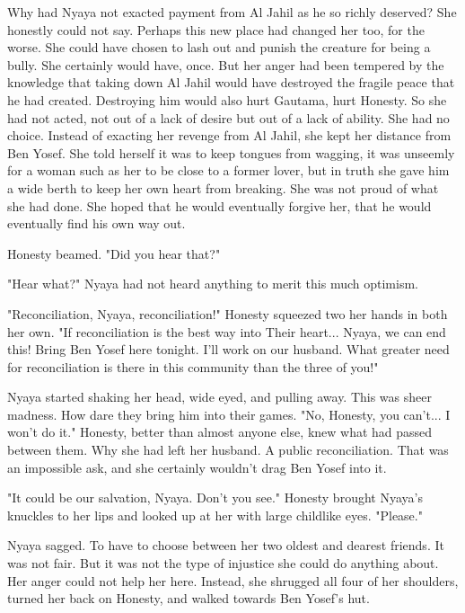 \documentclass{amsart}
\begin{document}
Why had Nyaya not exacted payment from Al Jahil as he so richly deserved? She honestly could not say. Perhaps this new place had changed her too, for the worse. She could have chosen to lash out and punish the creature for being a bully. She certainly would have, once. But her anger had been tempered by the knowledge that taking down Al Jahil would have destroyed the fragile peace that he had created. Destroying him would also hurt Gautama, hurt Honesty. So she had not acted, not out of a lack of desire but out of a lack of ability. She had no choice. Instead of exacting her revenge from Al Jahil, she kept her distance from Ben Yosef. She told herself it was to keep tongues from wagging, it was unseemly for a woman such as her to be close to a former lover, but in truth she gave him a wide berth to keep her own heart from breaking. She was not proud of what she had done. She hoped that he would eventually forgive her, that he would eventually find his own way out. 

Honesty beamed. "Did you hear that?"

"Hear what?" Nyaya had not heard anything to merit this much optimism.

"Reconciliation, Nyaya, reconciliation!" Honesty squeezed two her hands in both her own. "If reconciliation is the best way into Their heart... Nyaya, we can end this! Bring Ben Yosef here tonight. I'll work on our husband. What greater need for reconciliation is there in this community than the three of you!"

Nyaya started shaking her head, wide eyed, and pulling away. This was sheer madness. How dare they bring him into their games. "No, Honesty, you can't... I won't do it." Honesty, better than almost anyone else, knew what had passed between them. Why she had left her husband. A public reconciliation. That was an impossible ask, and she certainly wouldn't drag Ben Yosef into it. 

"It could be our salvation, Nyaya. Don't you see." Honesty brought Nyaya's knuckles to her lips and looked up at her with large childlike eyes. "Please."

Nyaya sagged. To have to choose between her two oldest and dearest friends. It was not fair. But it was not the type of injustice she could do anything about. Her anger could not help her here. Instead, she shrugged all four of her shoulders, turned her back on Honesty, and walked towards Ben Yosef's hut. 
\end{document}
